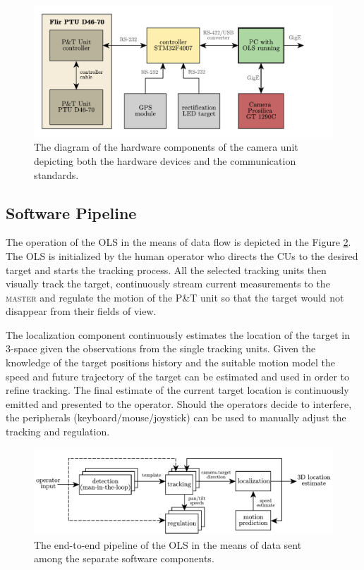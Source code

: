 \begin{figure}[htb]
	\centering
	\includegraphics[width=0.8\linewidth]{fig/hw_camera_unit.pdf}
	\caption{The diagram of the hardware components of the camera unit depicting both the hardware devices and the communication standards.}
	\label{fig:hw_camera_unit}
\end{figure}

\subsection{Software Pipeline} \label{txt:sw_pipeline}

The operation of the OLS in the means of data flow is depicted in the Figure \ref{fig:pipeline}. The OLS is initialized by the human operator who directs the CUs to the desired target and starts the tracking process. All the selected tracking units then visually track the target, continuously stream current measurements to the \textsc{master} and regulate the motion of the P\&T unit so that the target would not disappear from their fields of view.

The localization component continuously estimates the location of the target in 3-space given the observations from the single tracking units. Given the knowledge of the target positions history and the suitable motion model the speed and future trajectory of the target can be estimated and used in order to refine tracking. The final estimate of the current target location is continuously emitted and presented to the operator. Should the operators decide to interfere, the peripherals (keyboard/mouse/joystick) can be used to manually adjust the tracking and regulation.

\begin{figure}[htb]
	\centering
	\includegraphics[width=0.95\linewidth]{fig/pipeline.pdf}
	\caption{The end-to-end pipeline of the OLS in the means of data sent among the separate software components.}
	\label{fig:pipeline}
\end{figure}


